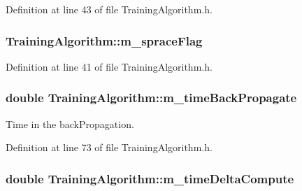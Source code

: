 Definition at line 43 of file Training\+Algorithm.\+h.

\subsubsection[{\texorpdfstring{m\+\_\+sprace\+Flag}{m_spraceFlag}}]{ Training\+Algorithm\+::m\+\_\+sprace\+Flag\hspace{0.3cm}{\ttfamily [private]}}\hypertarget{classTrainingAlgorithm_a22d150f15f730ae139a8267cea153a3e}{}\label{classTrainingAlgorithm_a22d150f15f730ae139a8267cea153a3e}


Definition at line 41 of file Training\+Algorithm.\+h.

\subsubsection[{\texorpdfstring{m\+\_\+time\+Back\+Propagate}{m_timeBackPropagate}}]{\setlength{\rightskip}{0pt plus 5cm}double Training\+Algorithm\+::m\+\_\+time\+Back\+Propagate\hspace{0.3cm}{\ttfamily [private]}}\hypertarget{classTrainingAlgorithm_a38a66c5c61c0f060572c966e88827f48}{}\label{classTrainingAlgorithm_a38a66c5c61c0f060572c966e88827f48}


Time in the back\+Propagation. 



Definition at line 73 of file Training\+Algorithm.\+h.

\subsubsection[{\texorpdfstring{m\+\_\+time\+Delta\+Compute}{m_timeDeltaCompute}}]{\setlength{\rightskip}{0pt plus 5cm}double Training\+Algorithm\+::m\+\_\+time\+Delta\+Compute\hspace{0.3cm}{\ttfamily [private]}}\hypertarget{classTrainingAlgorithm_aac9f0a53ea2677e3796af8b32d701b83}{}\label{classTrainingAlgorithm_aac9f0a53ea2677e3796af8b32d701b83}


